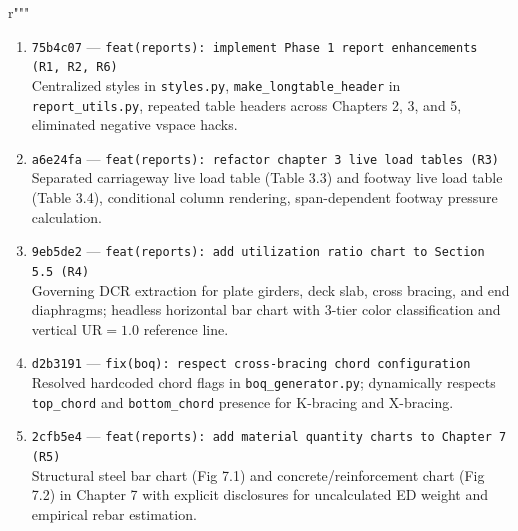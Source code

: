 r"""\documentclass[11pt,a4paper]{article}
\begin{document}
\begin{enumerate}
    \item \texttt{75b4c07} --- \texttt{feat(reports): implement Phase 1 report enhancements (R1, R2, R6)}\\
    Centralized styles in \texttt{styles.py}, \texttt{make\_longtable\_header} in \texttt{report\_utils.py}, repeated table headers across Chapters 2, 3, and 5, eliminated negative vspace hacks.
    \item \texttt{a6e24fa} --- \texttt{feat(reports): refactor chapter 3 live load tables (R3)}\\
    Separated carriageway live load table (Table 3.3) and footway live load table (Table 3.4), conditional column rendering, span-dependent footway pressure calculation.
    \item \texttt{9eb5de2} --- \texttt{feat(reports): add utilization ratio chart to Section 5.5 (R4)}\\
    Governing DCR extraction for plate girders, deck slab, cross bracing, and end diaphragms; headless horizontal bar chart with 3-tier color classification and vertical $\text{UR}=1.0$ reference line.
    \item \texttt{d2b3191} --- \texttt{fix(boq): respect cross-bracing chord configuration}\\
    Resolved hardcoded chord flags in \texttt{boq\_generator.py}; dynamically respects \texttt{top\_chord} and \texttt{bottom\_chord} presence for K-bracing and X-bracing.
    \item \texttt{2cfb5e4} --- \texttt{feat(reports): add material quantity charts to Chapter 7 (R5)}\\
    Structural steel bar chart (Fig 7.1) and concrete/reinforcement chart (Fig 7.2) in Chapter 7 with explicit disclosures for uncalculated ED weight and empirical rebar estimation.
\end{enumerate}
\end{document}
